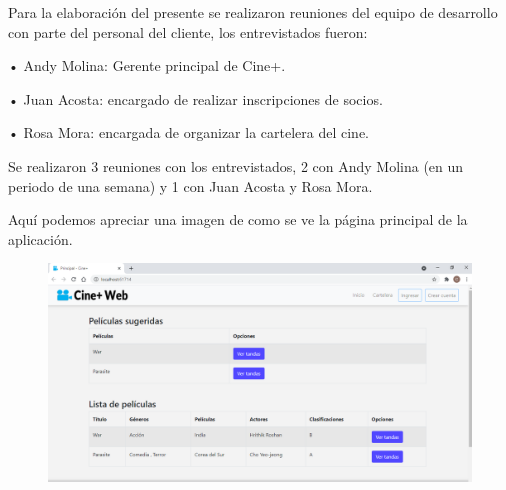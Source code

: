 \documentclass[letterpaper,12pt, oneside, onecolumn, openany]{book}
\begin{document}
Para la elaboración del presente se realizaron reuniones del equipo de desarrollo con parte del personal del cliente, los entrevistados fueron:

•	Andy Molina: Gerente principal de Cine+.

•	Juan Acosta: encargado de realizar inscripciones de socios.

•	Rosa Mora: encargada de organizar la cartelera del cine.

Se realizaron 3 reuniones con los entrevistados, 2 con Andy Molina (en un periodo de una semana) y 1 con Juan Acosta y Rosa Mora.

Aqu\'i podemos apreciar una imagen de como se ve la p\'agina principal de la aplicaci\'on.

	\begin{figure}[h]
		\begin{center}
			\includegraphics[width =14.0cm]{HomeCine+.png}
		\end{center}
	\end{figure}
\end{document}
